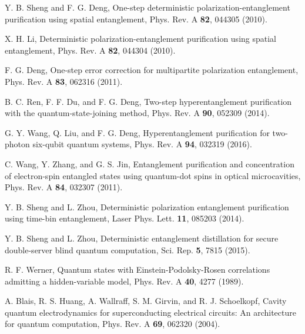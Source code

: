 \documentclass[showpacs,aps,graphicx,twocolumn]{revtex4}
\begin{document}
\begin{thebibliography}{1}
 Y. B. Sheng and F. G. Deng,
One-step deterministic polarization-entanglement purification using
spatial entanglement, Phys. Rev. A \textbf{82}, 044305 (2010).



X. H. Li, Deterministic polarization-entanglement purification
using spatial entanglement, Phys. Rev. A \textbf{82}, 044304 (2010).


 F. G. Deng, One-step error correction for multipartite polarization
entanglement, Phys. Rev. A \textbf{83}, 062316 (2011).




 B. C. Ren, F. F. Du, and F. G. Deng,
Two-step hyperentanglement purification with the
quantum-state-joining method, Phys. Rev. A \textbf{90}, 052309
(2014).


 G. Y. Wang, Q. Liu, and F. G. Deng,
Hyperentanglement purification for two-photon six-qubit quantum
systems, Phys. Rev. A \textbf{94}, 032319 (2016).


 C. Wang, Y. Zhang, and G. S. Jin,
Entanglement purification and concentration of electron-spin
entangled states using quantum-dot spins in optical microcavities,
Phys. Rev. A \textbf{84}, 032307 (2011).


 Y. B. Sheng and L. Zhou,
Deterministic polarization entanglement purification using time-bin entanglement,
Laser Phys. Lett. \textbf{11}, 085203 (2014).



 Y. B. Sheng and L. Zhou,
Deterministic entanglement distillation for secure double-server blind quantum computation,
Sci. Rep. \textbf{5}, 7815 (2015).





 R. F. Werner,
Quantum states with Einstein-Podolsky-Rosen correlations admitting a
hidden-variable model, Phys. Rev. A \textbf{40}, 4277 (1989).





 A. Blais, R. S. Huang, A. Wallraff, S. M. Girvin, and R. J. Schoelkopf,
Cavity quantum electrodynamics for superconducting electrical circuits:
An architecture for quantum computation, Phys. Rev. A \textbf{69}, 062320 (2004).



\end{thebibliography}
\end{document}
